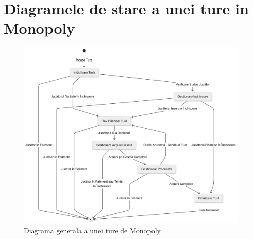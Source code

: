 \chapter{Diagramele de stare a unei ture in Monopoly}
\label{annex:turn_diagram}

\begin{figure}[H]
    \centering
    \includegraphics[width=16cm]{images/turn_state_diagram_overview.png}
    \caption{Diagrama generala a unei ture de Monopoly}
    \label{fig:turn_state_diagram_overviewl}
\end{figure}

